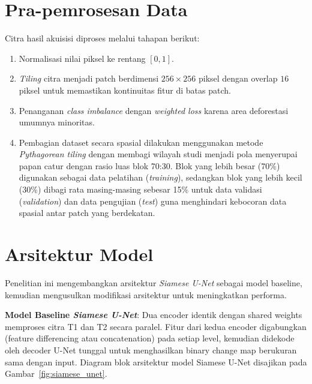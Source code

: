 \section{Pra-pemrosesan Data}
Citra hasil akuisisi diproses melalui tahapan berikut:
\begin{enumerate}
	\item Normalisasi nilai piksel ke rentang $[0,1]$.
	\item \textit{Tiling} citra menjadi patch berdimensi $256 \times 256$ piksel dengan overlap $16$ piksel untuk memastikan kontinuitas fitur di batas patch.
	\item Penanganan \textit{class imbalance} dengan \textit{weighted loss} karena area deforestasi umumnya minoritas.
	\item Pembagian dataset secara spasial dilakukan menggunakan metode \textit{Pythagorean tiling} \citep{youssef2023landslide} dengan membagi wilayah studi menjadi pola menyerupai papan catur dengan rasio luas blok 70:30. Blok yang lebih besar (70\%) digunakan sebagai data pelatihan (\textit{training}), sedangkan blok yang lebih kecil (30\%) dibagi rata masing-masing sebesar 15\% untuk data validasi (\textit{validation}) dan data pengujian (\textit{test}) guna menghindari kebocoran data spasial antar patch yang berdekatan.
\end{enumerate}

\section{Arsitektur Model}
Penelitian ini mengembangkan arsitektur \textit{Siamese U-Net} sebagai model baseline, kemudian mengusulkan modifikasi arsitektur untuk meningkatkan performa.

\textbf{Model Baseline \textit{Siamese U-Net}}:
Dua encoder identik dengan shared weights memproses citra T1 dan T2 secara paralel. Fitur dari kedua encoder digabungkan (feature differencing atau concatenation) pada setiap level, kemudian didekode oleh decoder U-Net tunggal untuk menghasilkan binary change map berukuran sama dengan input. Diagram blok arsitektur model Siamese U-Net disajikan pada Gambar~\ref{fig:siamese_unet}.


